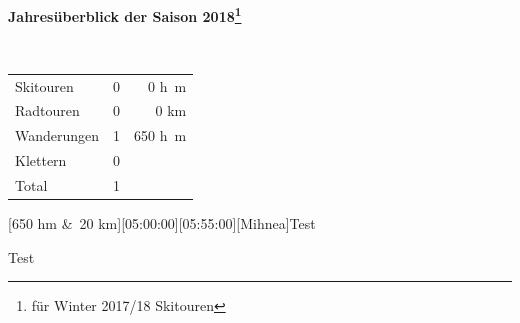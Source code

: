\begin{center}{\Large \textbf{ Jahres\"uberblick der Saison 2018\footnote{f\"ur Winter 2017/18  Skitouren}}} 

~

\begin{tabular}{lrr}
Skitouren & 0 & 0 \si{h\meter}\\
Radtouren& 0 & 0 \si{\kilo\meter}\\
Wanderungen& 1 & 650 \si{h\meter}\\
Klettern& 0&\\\hline
Total& 1 &
\end{tabular}\end{center}\newpage 
\begin{minipage}{\textwidth}[650 hm \&~20 km][05:00:00][05:55:00][Mihnea]\label{2018-06-10-Hot Springs}Test













 Test












\end{minipage}
